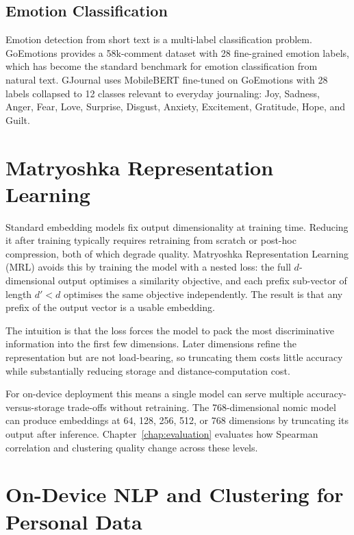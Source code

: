 \subsection{Emotion Classification}

Emotion detection from short text is a multi-label classification problem. GoEmotions \cite{demszky2020goemotions} provides a 58k-comment dataset with 28 fine-grained emotion labels, which has become the standard benchmark for emotion classification from natural text. GJournal uses MobileBERT fine-tuned on GoEmotions with 28 labels collapsed to 12 classes relevant to everyday journaling: Joy, Sadness, Anger, Fear, Love, Surprise, Disgust, Anxiety, Excitement, Gratitude, Hope, and Guilt.

\section{Matryoshka Representation Learning}
\label{sec:mrl_background}

Standard embedding models fix output dimensionality at training time. Reducing it after training typically requires retraining from scratch or post-hoc compression, both of which degrade quality. Matryoshka Representation Learning (MRL) \cite{kusupati2022matryoshka} avoids this by training the model with a nested loss: the full $d$-dimensional output optimises a similarity objective, and each prefix sub-vector of length $d' < d$ optimises the same objective independently. The result is that any prefix of the output vector is a usable embedding.

The intuition is that the loss forces the model to pack the most discriminative information into the first few dimensions. Later dimensions refine the representation but are not load-bearing, so truncating them costs little accuracy while substantially reducing storage and distance-computation cost.

For on-device deployment this means a single model can serve multiple accuracy-versus-storage trade-offs without retraining. The 768-dimensional nomic model can produce embeddings at 64, 128, 256, 512, or 768 dimensions by truncating its output after inference. Chapter~\ref{chap:evaluation} evaluates how Spearman correlation and clustering quality change across these levels.

\section{On-Device NLP and Clustering for Personal Data}

